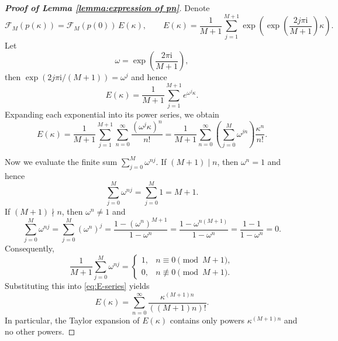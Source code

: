 \documentclass[preprint,3p,10pt]{elsarticle}
\theoremstyle{definition}
\begin{document}
\begin{proof}[\bf Proof of Lemma \ref{lemma:expression of pn}]
Denote
\begin{equation}\label{eq:implicit-pkappa}
    \mathcal{F}_M(p(\kappa))=\mathcal{F}_M(p(0))\,E(\kappa),
\qquad 
E(\kappa)=\frac{1}{M+1}\sum_{j=1}^{M+1}\exp\!\left(\exp\!\left(\frac{2j\pi \mathrm{i}}{M+1}\right)\kappa\right).
\end{equation}
Let
\begin{equation}
    \omega=\exp\!\left(\frac{2\pi \mathrm{i}}{M+1}\right),
\end{equation}
then $\exp\!\left(2j\pi \mathrm{i}/(M+1)\right)=\omega^{j}$ and hence
\begin{equation}
    E(\kappa)=\frac{1}{M+1}\sum_{j=1}^{M+1}e^{\omega^{j}\kappa}.
\end{equation}
Expanding each exponential into its power series, we obtain
\begin{equation} \label{eq:E-series}
E(\kappa)
=\frac{1}{M+1}\sum_{j=1}^{M+1}\sum_{n=0}^{\infty}\frac{(\omega^{j}\kappa)^n}{n!}
=\frac{1}{M+1}\sum_{n=0}^{\infty}\left(\sum_{j=0}^{M}\omega^{jn}\right)\frac{\kappa^n}{n!}.
\end{equation}

Now we evaluate the finite sum $\sum_{j=0}^{M}\omega^{nj}.$ If $(M+1)\mid n$, then $\omega^{n}=1$ and hence
\begin{equation}
    \sum_{j=0}^{M}\omega^{nj}=\sum_{j=0}^{M}1=M+1.
\end{equation}
If $(M+1)\nmid n$, then $\omega^{n}\neq 1$ and
\begin{equation}
    \sum_{j=0}^{M}\omega^{nj}=\sum_{j=0}^{M}(\omega^{n})^{j}
=\frac{1-(\omega^{n})^{M+1}}{1-\omega^{n}}
=\frac{1-\omega^{n(M+1)}}{1-\omega^{n}}
=\frac{1-1}{1-\omega^{n}}=0.
\end{equation}
Consequently,
\begin{equation}
    \frac{1}{M+1}\sum_{j=0}^{M}\omega^{nj}=
\begin{cases}
1, & n\equiv 0 \pmod{M+1},\\
0, & n\not\equiv 0 \pmod{M+1}.
\end{cases}
\end{equation}
Substituting this into \eqref{eq:E-series} yields
\begin{equation}
    E(\kappa)=\sum_{n=0}^{\infty}\frac{\kappa^{(M+1)n}}{((M+1)n)!}.
\end{equation}
In particular, the Taylor expansion of $E(\kappa)$ contains only powers $\kappa^{(M+1)n}$ and no other powers.



\end{proof}
\end{document}
